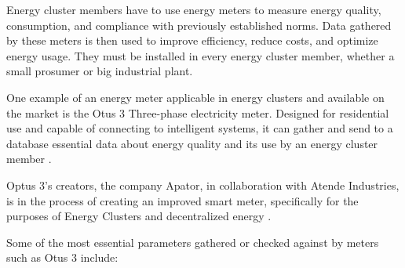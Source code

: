 \par Energy cluster members have to use energy meters to measure energy quality, consumption, and compliance with previously established norms. Data gathered by these meters is then used to improve efficiency, reduce costs, and optimize energy usage. They must be installed in every energy cluster member, whether a small prosumer or big industrial plant.
\par One example of an energy meter applicable in energy clusters and available on the market is the Otus 3 Three-phase electricity meter. Designed for residential use and capable of connecting to intelligent systems, it can gather and send to a database essential data about energy quality and its use by an energy cluster member \citep{otus}.
\par Optus 3's creators, the company Apator, in collaboration with Atende Industries, is in the process of creating an improved smart meter, specifically for the purposes of Energy Clusters and decentralized energy \citep{atende}.
\par Some of the most essential parameters gathered or checked against by meters such as Otus 3 include:
